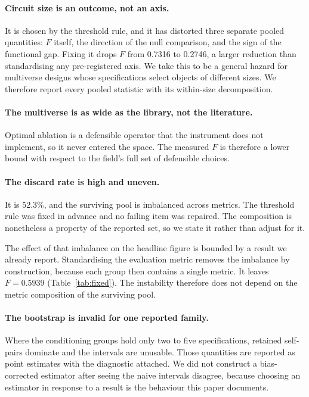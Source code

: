 \documentclass[letterpaper]{article} %
\begin{document}
\paragraph{Circuit size is an outcome, not an axis.}
It is chosen by the threshold rule, and it has distorted three separate pooled
quantities: $F$ itself, the direction of the null comparison, and the sign of
the functional gap. Fixing it drops $F$ from 0.7316 to 0.2746, a larger
reduction than standardising any pre-registered axis. We take this to be a
general hazard for multiverse designs whose specifications select objects of
different sizes. We therefore report every pooled statistic with its within-size
decomposition.

\paragraph{The multiverse is as wide as the library, not the literature.}
Optimal ablation \citep{li2024} is a defensible operator that the instrument
does not implement, so it never entered the space. The measured $F$ is therefore
a lower bound with respect to the field's full set of defensible choices.

\paragraph{The discard rate is high and uneven.}
It is 52.3\%, and the surviving pool is imbalanced across metrics. The threshold
rule was fixed in advance and no failing item was repaired. The composition is
nonetheless a property of the reported set, so we state it rather than adjust
for it.

The effect of that imbalance on the headline figure is bounded by a result we
already report. Standardising the evaluation metric removes the imbalance by
construction, because each group then contains a single metric. It leaves
$F = 0.5939$ (Table~\ref{tab:fixed}). The instability therefore does not depend
on the metric composition of the surviving pool.

\paragraph{The bootstrap is invalid for one reported family.}
Where the conditioning groups hold only two to five specifications, retained
self-pairs dominate and the intervals are unusable. Those quantities are
reported as point estimates with the diagnostic attached. We did not construct a
bias-corrected estimator after seeing the naive intervals disagree, because
choosing an estimator in response to a result is the behaviour this paper
documents.
\end{document}
